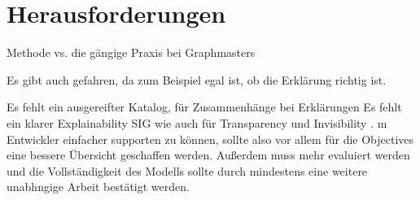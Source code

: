 \section{Herausforderungen}

Methode vs. die gängige Praxis bei Graphmasters

Es gibt auch gefahren, da zum Beispiel egal ist, ob die Erklärung richtig ist.

Es fehlt ein ausgereifter Katalog, für Zusammenhänge bei Erklärungen
Es fehlt ein klarer Explainability SIG wie auch für Transparency \cite{do2010software} und Invisibility \cite{carvalho2020developers}. m Entwickler einfacher supporten zu können, sollte also vor allem für die Objectives eine bessere Übersicht geschaffen werden.
Außerdem muss mehr evaluiert werden und die Vollständigkeit des Modells sollte durch mindestens eine weitere unabhngige Arbeit bestätigt werden.